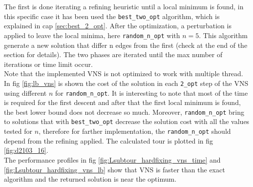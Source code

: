 The first is done iterating a refining heuristic until a local minimum is found, in this specific case it has been used the \texttt{best\_two\_opt} algorithm, which is explained in cap \ref{sec:best_2_opt}. After the optimization, a perturbation is applied to leave the local minima, here \texttt{random\_n\_opt} with $ n=5 $. This algorithm generate a new solution that differ n edges from the first (check at the end of the section for details).
The two phases are iterated until the max number of iterations or time limit occur.\\
Note that the implemented VNS is not optimized to work with multiple thread.\\
In fig \ref{fig:lb_vns} is shown the cost of the solution in each \texttt{2\_opt} step of the VNS using different $ n $ for \texttt{random\_n\_opt}. It is interesting to note that most of the time is required for the first descent and after that the first local minimum is found, the best lower bound does not decrease so much. Moreover, \texttt{random\_n\_opt} bring to solutions that with \texttt{best\_two\_opt} decrease the solution cost with all the values tested for $ n $, therefore for farther implementation, the \texttt{random\_n\_opt} should depend from the refining applied.
The calculated tour is plotted in fig \ref{fig:d2103_16}.\\
The performance profiles in fig \ref{fig:Lsubtour_hardfixing_vns_time} and \ref{fig:Lsubtour_hardfixing_vns_lb} show that VNS is faster than the exact algorithm and the returned solution is near the optimum.

